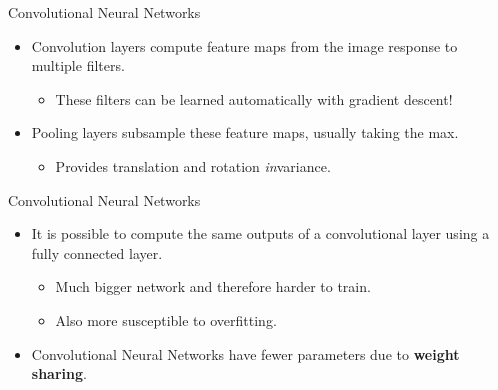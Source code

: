 \begin{frame}{Convolutional Neural Networks}
	\begin{itemize}
		\item Convolution layers compute feature maps from the image response to multiple filters.
		      \begin{itemize}
		      	\item These filters can be learned automatically with gradient descent!
		      \end{itemize}
		\item Pooling layers subsample these feature maps, usually taking the max.
		      \begin{itemize}
		      	\item Provides translation and rotation \textit{in}variance.
		      \end{itemize}
	\end{itemize}
\end{frame}

\begin{frame}{Convolutional Neural Networks}
	\begin{itemize}
		\item It is possible to compute the same outputs of a convolutional layer using a fully connected layer.
		      \begin{itemize}
		      	\item Much bigger network and therefore harder to train.
		      	\item Also more susceptible to overfitting.
		      \end{itemize}
		\item Convolutional Neural Networks have fewer parameters due to \textbf{weight sharing}.
	\end{itemize}
\end{frame}

